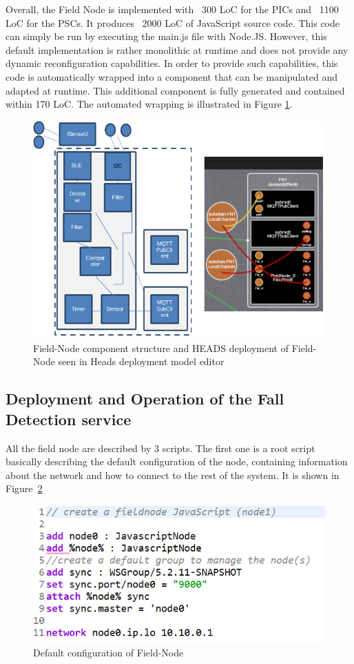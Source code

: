 Overall, the Field Node is implemented with ~300 LoC for the PICs and ~1100 LoC for the PSCs. It produces ~2000 LoC of JavaScript source code. This code can simply be run by executing the main.js file with Node.JS. However, this default implementation is rather monolithic at runtime and does not provide any dynamic reconfiguration capabilities. In order to provide such capabilities, this code is automatically wrapped into a component that can be manipulated and adapted at runtime. This additional component is fully generated and contained within 170 LoC. The automated wrapping is illustrated in Figure \ref{fig:fig5}. 

\begin{figure}[h]
	\centering
	\includegraphics[width=0.75\linewidth]{figures/fig5-b}
	\caption{Field-Node component structure and HEADS deployment of Field-Node seen in Heads deployment model editor}
	\label{fig:fig5}
\end{figure}


\subsection{Deployment and Operation of the Fall Detection service}
All the field node are described by 3 scripts. The first one is a root script basically describing the default configuration of the node, containing information about the network and how to connect to the rest of the system. It is shown in Figure~\ref{fig:fig6}

\begin{figure}[h]
	\centering
	\includegraphics[width=0.7\linewidth]{figures/fig6}
	\caption{Default configuration of Field-Node}
	\label{fig:fig6}
\end{figure}

